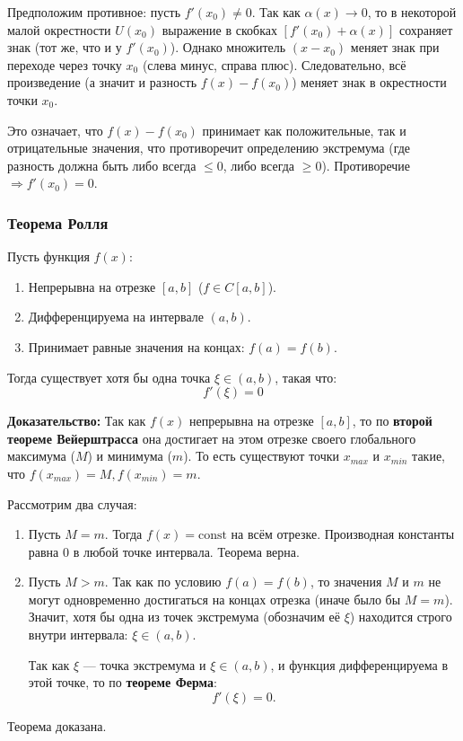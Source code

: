 Предположим противное: пусть $f'(x_0) \neq 0$.
Так как $\alpha(x) \to 0$, то в некоторой малой окрестности $U(x_0)$ выражение в скобках $\left[ f'(x_0) + \alpha(x) \right]$ сохраняет знак (тот же, что и у $f'(x_0)$).
Однако множитель $(x - x_0)$ меняет знак при переходе через точку $x_0$ (слева минус, справа плюс).
Следовательно, всё произведение (а значит и разность $f(x) - f(x_0)$) меняет знак в окрестности точки $x_0$.

Это означает, что $f(x) - f(x_0)$ принимает как положительные, так и отрицательные значения, что противоречит определению экстремума (где разность должна быть либо всегда $\le 0$, либо всегда $\ge 0$).
Противоречие $\Rightarrow f'(x_0) = 0$.

\subsubsection*{Теорема Ролля}

\begin{tcolorbox}[title=Теорема Ролля (О нулях производной)]
    Пусть функция $f(x)$:
    \begin{enumerate}
        \item Непрерывна на отрезке $[a, b]$ ($f \in C[a, b]$).
        \item Дифференцируема на интервале $(a, b)$.
        \item Принимает равные значения на концах: $f(a) = f(b)$.
    \end{enumerate}
    Тогда существует хотя бы одна точка $\xi \in (a, b)$, такая что:
    \[ f'(\xi) = 0 \]
\end{tcolorbox}

\textbf{Доказательство:}
Так как $f(x)$ непрерывна на отрезке $[a, b]$, то по \textbf{второй теореме Вейерштрасса} она достигает на этом отрезке своего глобального максимума ($M$) и минимума ($m$).
То есть существуют точки $x_{max}$ и $x_{min}$ такие, что $f(x_{max}) = M, f(x_{min}) = m$.

Рассмотрим два случая:
\begin{enumerate}
    \item Пусть $M = m$.
    Тогда $f(x) = \text{const}$ на всём отрезке. Производная константы равна 0 в любой точке интервала. Теорема верна.

    \item Пусть $M > m$.
    Так как по условию $f(a) = f(b)$, то значения $M$ и $m$ не могут одновременно достигаться на концах отрезка (иначе было бы $M=m$).
    Значит, хотя бы одна из точек экстремума (обозначим её $\xi$) находится строго внутри интервала: $\xi \in (a, b)$.
    
    Так как $\xi$ — точка экстремума и $\xi \in (a, b)$, и функция дифференцируема в этой точке, то по \textbf{теореме Ферма}:
    \[ f'(\xi) = 0. \]
\end{enumerate}
Теорема доказана.


